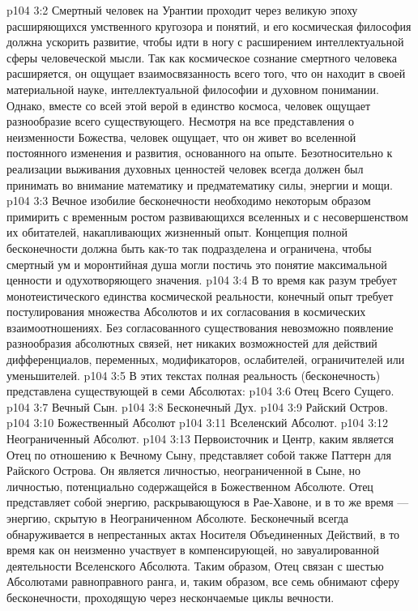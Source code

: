 \vs p104 3:2 Смертный человек на Урантии проходит через великую эпоху расширяющихся умственного кругозора и понятий, и его космическая философия должна ускорить развитие, чтобы идти в ногу с расширением интеллектуальной сферы человеческой мысли. Так как космическое сознание смертного человека расширяется, он ощущает взаимосвязанность всего того, что он находит в своей материальной науке, интеллектуальной философии и духовном понимании. Однако, вместе со всей этой верой в единство космоса, человек ощущает разнообразие всего существующего. Несмотря на все представления о неизменности Божества, человек ощущает, что он живет во вселенной постоянного изменения и развития, основанного на опыте. Безотносительно к реализации выживания духовных ценностей человек всегда должен был принимать во внимание математику и предматематику силы, энергии и мощи.
\vs p104 3:3 Вечное изобилие бесконечности необходимо некоторым образом примирить с временным ростом развивающихся вселенных и с несовершенством их обитателей, накапливающих жизненный опыт. Концепция полной бесконечности должна быть как\hyp{}то так подразделена и ограничена, чтобы смертный ум и моронтийная душа могли постичь это понятие максимальной ценности и одухотворяющего значения.
\vs p104 3:4 В то время как разум требует монотеистического единства космической реальности, конечный опыт требует постулирования множества Абсолютов и их согласования в космических взаимоотношениях. Без согласованного существования невозможно появление разнообразия абсолютных связей, нет никаких возможностей для действий дифференциалов, переменных, модификаторов, ослабителей, ограничителей или уменьшителей.
\vs p104 3:5 \pc В этих текстах полная реальность (бесконечность) представлена существующей в семи Абсолютах:
\vs p104 3:6 \bibnobreakspace Отец Всего Сущего.
\vs p104 3:7 \bibnobreakspace Вечный Сын.
\vs p104 3:8 \bibnobreakspace Бесконечный Дух.
\vs p104 3:9 \bibnobreakspace Райский Остров.
\vs p104 3:10 \bibnobreakspace Божественный Абсолют
\vs p104 3:11 \bibnobreakspace Вселенский Абсолют.
\vs p104 3:12 \bibnobreakspace Неограниченный Абсолют.
\vs p104 3:13 \pc Первоисточник и Центр, каким является Отец по отношению к Вечному Сыну, представляет собой также Паттерн для Райского Острова. Он является личностью, неограниченной в Сыне, но личностью, потенциально содержащейся в Божественном Абсолюте. Отец представляет собой энергию, раскрывающуюся в Рае\hyp{}Хавоне, и в то же время --- энергию, скрытую в Неограниченном Абсолюте. Бесконечный всегда обнаруживается в непрестанных актах Носителя Объединенных Действий, в то время как он неизменно участвует в компенсирующей, но завуалированной деятельности Вселенского Абсолюта. Таким образом, Отец связан с шестью Абсолютами равноправного ранга, и, таким образом, все семь обнимают сферу бесконечности, проходящую через нескончаемые циклы вечности.
